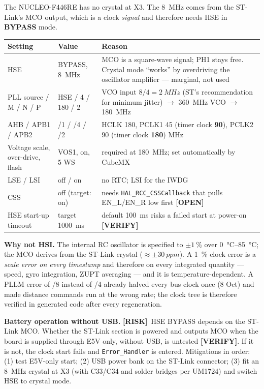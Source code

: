 \documentclass[11pt,a4paper]{article}
\newcommand{\mk}[2]{\textsf{\scriptsize\bfseries\colorbox{#1bg}{\color{#1}[#2]}}}
\newcommand{\VERIFY}{\mk{cold}{VERIFY}}
\newcommand{\RISK}{\mk{bad}{RISK}}
\newcommand{\OPEN}{\mk{grey}{OPEN}}
\newcommand{\code}[1]{\texttt{\small #1}}
\begin{document}
The NUCLEO-F446RE has no crystal at X3. The \qty{8}{MHz} comes from the
ST-Link's MCO output, which is a clock \emph{signal} and therefore needs HSE in
\textbf{BYPASS} mode.

\begin{center}
\small
\begin{tabularx}{\textwidth}{@{}llL@{}}
\toprule
\textbf{Setting} & \textbf{Value} & \textbf{Reason}\\
\midrule
HSE & BYPASS, \qty{8}{MHz} & MCO is a square-wave signal; PH1 stays free. Crystal mode ``works'' by overdriving the oscillator amplifier --- marginal, not used\\
PLL source / M / N / P & HSE / 4 / 180 / 2 & VCO input $8/4=\qty{2}{MHz}$ (ST's recommendation for minimum jitter) $\to$ \qty{360}{MHz} VCO $\to$ \qty{180}{MHz}\\
AHB / APB1 / APB2 & /1 / /4 / /2 & HCLK 180, PCLK1 45 (timer clock \textbf{90}), PCLK2 90 (timer clock \textbf{180}) \si{MHz}\\
Voltage scale, over-drive, flash & VOS1, on, 5 WS & required at \qty{180}{MHz}; set automatically by CubeMX\\
LSE / LSI & off / on & no RTC; LSI for the IWDG\\
CSS & off (target: on) & needs \code{HAL\_RCC\_CSSCallback} that pulls EN\_L/EN\_R low first \OPEN\\
HSE start-up timeout & target \qty{1000}{ms} & default \qty{100}{ms} risks a failed start at power-on \VERIFY\\
\bottomrule
\end{tabularx}
\end{center}

\textbf{Why not HSI.} The internal RC oscillator is specified to
$\pm\qty{1}{\percent}$ over \qtyrange{0}{85}{\celsius}; the MCO derives from the
ST-Link crystal ($\approx\pm\qty{30}{ppm}$). A \qty{1}{\percent} clock error is a
\emph{scale error on every timestamp} and therefore on every integrated
quantity --- speed, gyro integration, ZUPT averaging --- and it is
temperature-dependent. A PLLM error of /8 instead of /4 already halved every bus
clock once (8 Oct) and made distance commands run at the wrong rate; the clock
tree is therefore verified in generated code after every regeneration.

\begin{warnbox}
\textbf{Battery operation without USB.} \RISK\ HSE BYPASS depends on the
ST-Link MCO. Whether the ST-Link section is powered and outputs MCO when the
board is supplied through E5V only, without USB, is untested \VERIFY. If it is
not, the clock start fails and \code{Error\_Handler} is entered. Mitigations in
order: (1) test E5V-only start; (2) USB power bank on the ST-Link connector; (3)
fit an \qty{8}{MHz} crystal at X3 (with C33/C34 and solder bridges per UM1724)
and switch HSE to crystal mode.
\end{warnbox}
\end{document}
